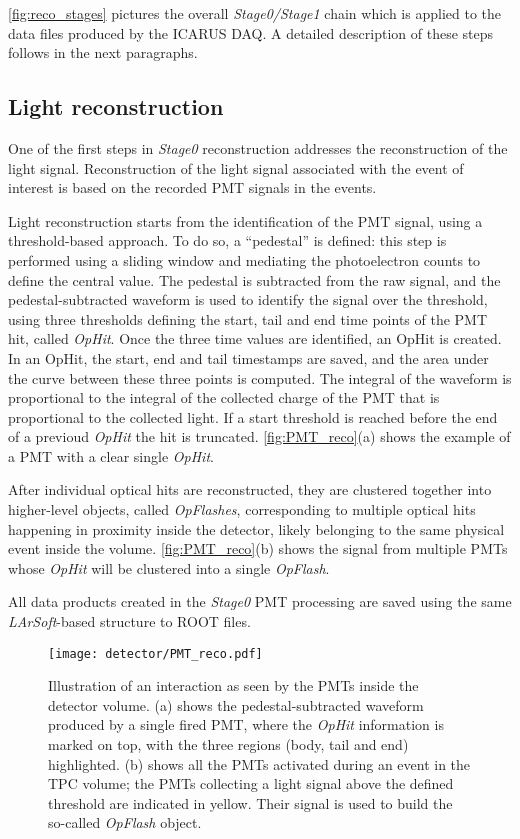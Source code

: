 \autoref{fig:reco_stages} pictures the overall \emph{Stage0/Stage1} chain which is applied to the data files produced by the ICARUS DAQ. A detailed description of these steps follows in the next paragraphs. 

\subsection{Light reconstruction}

One of the first steps in \emph{Stage0} reconstruction addresses the reconstruction of the light signal. Reconstruction of the light signal associated with the event of interest is based on the recorded PMT signals in the events.

Light reconstruction starts from the identification of the PMT signal, using a threshold-based approach. To do so, a ``pedestal'' is defined: this step is performed using a sliding window and mediating the photoelectron counts to define the central value. The pedestal is subtracted from the raw signal, and the pedestal-subtracted waveform is used to identify the signal over the threshold, using three thresholds defining the start, tail and end time points of the PMT hit, called \emph{OpHit}. Once the three time values are identified, an OpHit is created. In an OpHit, the start, end and tail timestamps are saved, and the area under the curve between these three points is computed. The integral of the waveform is proportional to the integral of the collected charge of the PMT that is proportional to the collected light. If a start threshold is reached before the end of a previoud \emph{OpHit} the hit is truncated. \autoref{fig:PMT_reco}(a) shows the example of a PMT with a clear single \emph{OpHit}. 

After individual optical hits are reconstructed, they are clustered together into higher-level objects, called \emph{OpFlashes}, corresponding to multiple optical hits happening in proximity inside the detector, likely belonging to the same physical event inside the volume. \autoref{fig:PMT_reco}(b) shows the signal from multiple PMTs whose \emph{OpHit} will be clustered into a single \emph{OpFlash}.

All data products created in the \emph{Stage0} PMT processing are saved using the same \emph{LArSoft}-based structure to ROOT files. 

\begin{figure}
    \centering
    \texttt{[image: detector/PMT\_reco.pdf]}
    \caption[PMT reconstructed \emph{OpHits}]{Illustration of an interaction as seen by the PMTs inside the detector volume. (a) shows the pedestal-subtracted waveform produced by a single fired PMT, where the \emph{OpHit} information is marked on top, with the three regions (body, tail and end) highlighted. (b) shows all the PMTs activated during an event in the TPC volume; the PMTs collecting a light signal above the defined threshold are indicated in yellow. Their signal is used to build the so-called \emph{OpFlash} object.}
    \label{fig:PMT_reco}
\end{figure}

